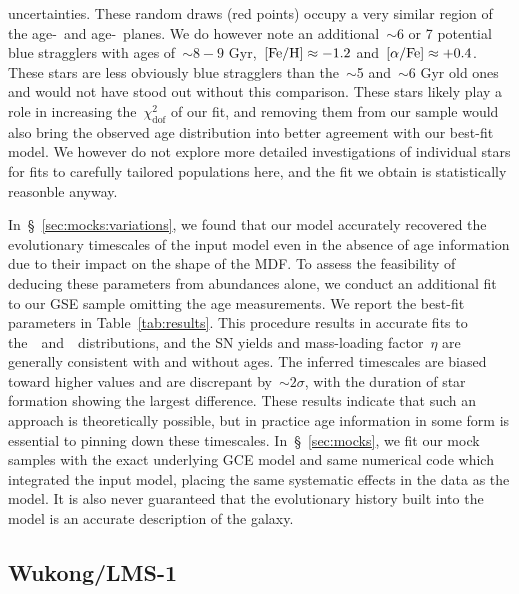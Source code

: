 \documentclass[foo.tex]{subfiles}
\begin{document}
uncertainties.
These random draws (red points) occupy a very similar region of the age-\feh~and
age-\afe~planes.
We do however note an additional~$\sim$6 or 7 potential blue stragglers with
ages of~$\sim$$8 - 9$ Gyr,~$\text{[Fe/H]} \approx -1.2$ and~$\text{[$\alpha$/Fe]} \approx +0.4$.
These stars are less obviously blue stragglers than the~$\sim$5 and~$\sim$6 Gyr
old ones and would not have stood out without this comparison.
These stars likely play a role in increasing the~$\chi_\text{dof}^2$ of our
fit, and removing them from our sample would also bring the observed age
distribution into better agreement with our best-fit model.
We however do not explore more detailed investigations of individual stars for
fits to carefully tailored populations here, and the fit we obtain is
statistically reasonble anyway.
\par
In~\S~\ref{sec:mocks:variations}, we found that our model accurately recovered
the evolutionary timescales of the input model even in the absence of age
information due to their impact on the shape of the MDF.
To assess the feasibility of deducing these parameters from abundances alone,
we conduct an additional fit to our GSE sample omitting the age measurements.
We report the best-fit parameters in Table~\ref{tab:results}.
This procedure results in accurate fits to the~\feh~and~\afe~distributions, and
the SN yields and mass-loading factor~$\eta$ are generally consistent with
and without ages.
The inferred timescales are biased toward higher values and are discrepant
by~$\sim$$2\sigma$, with the duration of star formation showing the largest
difference.
These results indicate that such an approach is theoretically possible, but in
practice age information in some form is essential to pinning down these
timescales.
In~\S~\ref{sec:mocks}, we fit our mock samples with the exact underlying GCE
model and same numerical code which integrated the input model, placing the
same systematic effects in the data as the model.
It is also never guaranteed that the evolutionary history built into the model
is an accurate description of the galaxy.

\subsection{Wukong/LMS-1}
\label{sec:h3:wukong}
\end{document}

